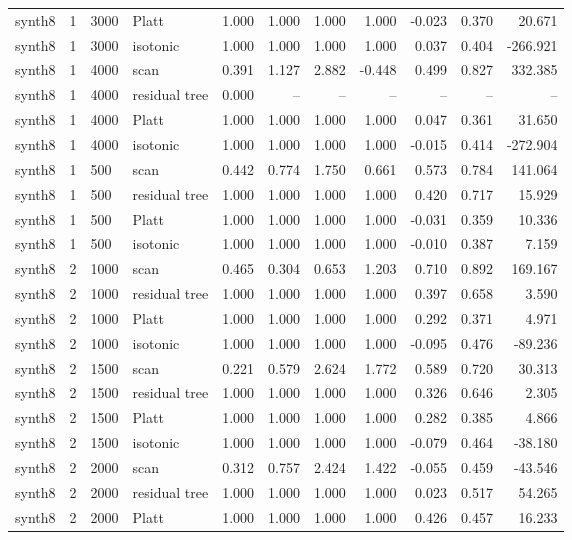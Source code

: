 \begin{tabular}{lrllrrrrrrr}
synth8 & 1 & 3000 & Platt & 1.000 & 1.000 & 1.000 & 1.000 & -0.023 & 0.370 & 20.671 \\
synth8 & 1 & 3000 & isotonic & 1.000 & 1.000 & 1.000 & 1.000 & 0.037 & 0.404 & -266.921 \\
synth8 & 1 & 4000 & scan & 0.391 & 1.127 & 2.882 & -0.448 & 0.499 & 0.827 & 332.385 \\
synth8 & 1 & 4000 & residual tree & 0.000 & -- & -- & -- & -- & -- & -- \\
synth8 & 1 & 4000 & Platt & 1.000 & 1.000 & 1.000 & 1.000 & 0.047 & 0.361 & 31.650 \\
synth8 & 1 & 4000 & isotonic & 1.000 & 1.000 & 1.000 & 1.000 & -0.015 & 0.414 & -272.904 \\
synth8 & 1 & 500 & scan & 0.442 & 0.774 & 1.750 & 0.661 & 0.573 & 0.784 & 141.064 \\
synth8 & 1 & 500 & residual tree & 1.000 & 1.000 & 1.000 & 1.000 & 0.420 & 0.717 & 15.929 \\
synth8 & 1 & 500 & Platt & 1.000 & 1.000 & 1.000 & 1.000 & -0.031 & 0.359 & 10.336 \\
synth8 & 1 & 500 & isotonic & 1.000 & 1.000 & 1.000 & 1.000 & -0.010 & 0.387 & 7.159 \\
synth8 & 2 & 1000 & scan & 0.465 & 0.304 & 0.653 & 1.203 & 0.710 & 0.892 & 169.167 \\
synth8 & 2 & 1000 & residual tree & 1.000 & 1.000 & 1.000 & 1.000 & 0.397 & 0.658 & 3.590 \\
synth8 & 2 & 1000 & Platt & 1.000 & 1.000 & 1.000 & 1.000 & 0.292 & 0.371 & 4.971 \\
synth8 & 2 & 1000 & isotonic & 1.000 & 1.000 & 1.000 & 1.000 & -0.095 & 0.476 & -89.236 \\
synth8 & 2 & 1500 & scan & 0.221 & 0.579 & 2.624 & 1.772 & 0.589 & 0.720 & 30.313 \\
synth8 & 2 & 1500 & residual tree & 1.000 & 1.000 & 1.000 & 1.000 & 0.326 & 0.646 & 2.305 \\
synth8 & 2 & 1500 & Platt & 1.000 & 1.000 & 1.000 & 1.000 & 0.282 & 0.385 & 4.866 \\
synth8 & 2 & 1500 & isotonic & 1.000 & 1.000 & 1.000 & 1.000 & -0.079 & 0.464 & -38.180 \\
synth8 & 2 & 2000 & scan & 0.312 & 0.757 & 2.424 & 1.422 & -0.055 & 0.459 & -43.546 \\
synth8 & 2 & 2000 & residual tree & 1.000 & 1.000 & 1.000 & 1.000 & 0.023 & 0.517 & 54.265 \\
synth8 & 2 & 2000 & Platt & 1.000 & 1.000 & 1.000 & 1.000 & 0.426 & 0.457 & 16.233 \\

\end{tabular}
